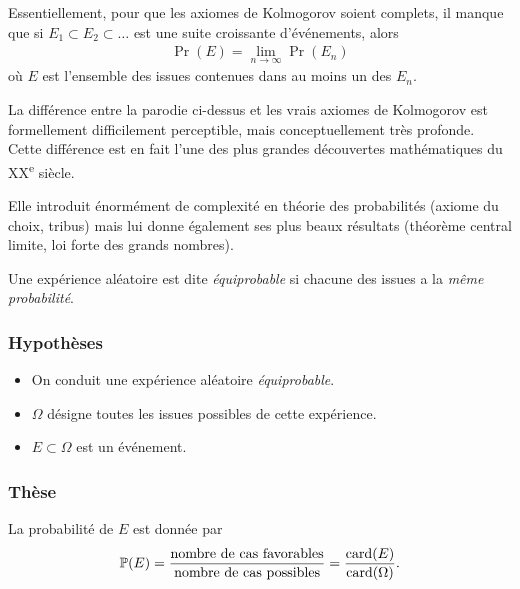 \documentclass[main.tex]{subfiles}
\begin{document}
\begin{remark}

    Essentiellement, pour que les axiomes de Kolmogorov soient complets,
    il manque que si $E_1 \subset E_2 \subset \ldots$ est une suite croissante d'événements,
    alors
    \begin{align}
        \Pr(E) = \lim_{n \to \infty} \Pr(E_n)
    \end{align}
    où $E$ est l'ensemble des issues contenues dans au moins un des $E_n$.

    La différence entre la parodie ci-dessus et les vrais axiomes de Kolmogorov est formellement difficilement perceptible,
    mais conceptuellement très profonde.
    Cette différence est en fait l'une des plus grandes découvertes mathématiques du XX\textsuperscript{e} siècle.

    Elle introduit énormément de complexité en théorie des probabilités
    (axiome du choix, tribus)
    mais lui donne également ses plus beaux résultats
    (théorème central limite, loi forte des grands nombres).
\end{remark}

\begin{definition}
    [Équiprobabilité]

    Une expérience aléatoire est dite \emph{équiprobable}
    si chacune des issues a la \emph{même probabilité}.
\end{definition}

\begin{proposition}

    \subsubsection{Hypothèses}
    \begin{itemize}
        \item On conduit une expérience aléatoire \emph{équiprobable}.
        \item $\Omega$ désigne toutes les issues possibles de cette expérience.
        \item $E \subset \Omega$ est un événement.
    \end{itemize}

    \subsubsection{Thèse}
    La probabilité de $E$ est donnée par
    \begin{align}
        \mathbb{P}(E) = \frac {\text{nombre de cas favorables}} {\text{nombre de cas possibles}}
        = \frac {\operatorname{card}(E)} {\operatorname{card}(\Omega)}.
    \end{align}
\end{proposition}
\end{document}
